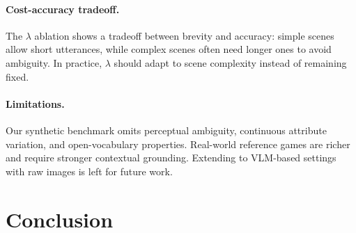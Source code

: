 \documentclass[10pt]{article}
\begin{document}

\paragraph{Cost-accuracy tradeoff.} The $\lambda$ ablation shows a tradeoff between brevity and accuracy: simple scenes allow short utterances, while complex scenes often need longer ones to avoid ambiguity. In practice, $\lambda$ should adapt to scene complexity instead of remaining fixed.

\paragraph{Limitations.} Our synthetic benchmark omits perceptual ambiguity, continuous attribute variation, and open-vocabulary properties. Real-world reference games are richer and require stronger contextual grounding. Extending to VLM-based settings with raw images is left for future work.

\section{Conclusion}

\end{document}
